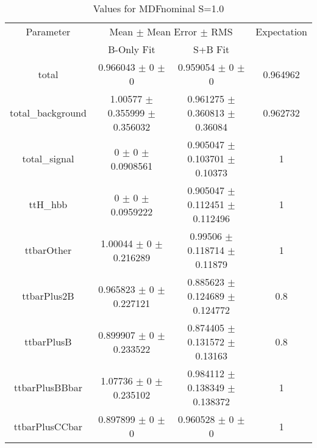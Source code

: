 \begin{table}
\centering
\caption{Values for MDFnominal S=1.0}
\begin{tabular}{cccc}
\toprule
Parameter & \multicolumn{2}{c}{Mean $\pm$ Mean Error $\pm$ RMS} & Expectation\\
 & B-Only Fit & S+B Fit & \\
\midrule
total & \num{0.966043} $\pm$ \num{0} $\pm$ \num{0} & \num{0.959054} $\pm$ \num{0} $\pm$ \num{0} & \num{0.964962}\\
total\_background & \num{1.00577} $\pm$ \num{0.355999} $\pm$ \num{0.356032} & \num{0.961275} $\pm$ \num{0.360813} $\pm$ \num{0.36084} & \num{0.962732}\\
total\_signal & \num{0} $\pm$ \num{0} $\pm$ \num{0.0908561} & \num{0.905047} $\pm$ \num{0.103701} $\pm$ \num{0.10373} & \num{1}\\
ttH\_hbb & \num{0} $\pm$ \num{0} $\pm$ \num{0.0959222} & \num{0.905047} $\pm$ \num{0.112451} $\pm$ \num{0.112496} & \num{1}\\
ttbarOther & \num{1.00044} $\pm$ \num{0} $\pm$ \num{0.216289} & \num{0.99506} $\pm$ \num{0.118714} $\pm$ \num{0.11879} & \num{1}\\
ttbarPlus2B & \num{0.965823} $\pm$ \num{0} $\pm$ \num{0.227121} & \num{0.885623} $\pm$ \num{0.124689} $\pm$ \num{0.124772} & \num{0.8}\\
ttbarPlusB & \num{0.899907} $\pm$ \num{0} $\pm$ \num{0.233522} & \num{0.874405} $\pm$ \num{0.131572} $\pm$ \num{0.13163} & \num{0.8}\\
ttbarPlusBBbar & \num{1.07736} $\pm$ \num{0} $\pm$ \num{0.235102} & \num{0.984112} $\pm$ \num{0.138349} $\pm$ \num{0.138372} & \num{1}\\
ttbarPlusCCbar & \num{0.897899} $\pm$ \num{0} $\pm$ \num{0} & \num{0.960528} $\pm$ \num{0} $\pm$ \num{0} & \num{1}\\
\bottomrule
\end{tabular}
\end{table}